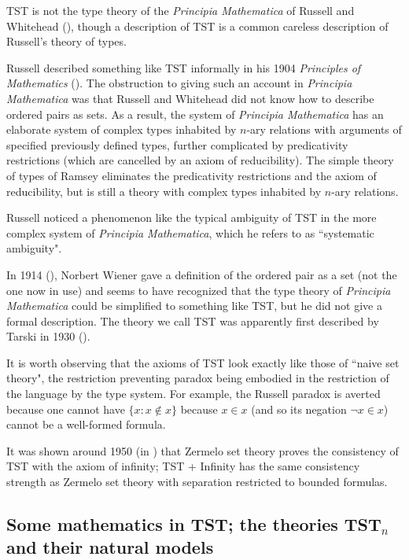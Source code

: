 \documentclass[112pt]{article}
\begin{document}
TST is not the type theory of the {\em Principia Mathematica\/} of Russell and Whitehead (\cite{pm}), though a description of TST is a common careless description of Russell's theory of types.

Russell described something like TST informally in his 1904 {\em Principles of Mathematics\/} (\cite{pm1}).  The obstruction to giving such an account in {\em Principia Mathematica\/} was that
Russell and Whitehead did not know how to describe ordered pairs as sets.  As a result, the system of {\em Principia Mathematica\/} has an elaborate system of  complex
types inhabited by $n$-ary relations with arguments of specified previously defined types, further complicated by predicativity restrictions (which are cancelled by an axiom of reducibility).
The simple theory of types of Ramsey eliminates the predicativity restrictions and the axiom of reducibility, but is still a theory with complex types inhabited by $n$-ary relations.

Russell noticed a phenomenon like the typical ambiguity of TST in the more complex system of {\em Principia Mathematica\/}, which he refers to as ``systematic ambiguity".

In 1914 (\cite{wiener}), Norbert Wiener gave a definition of the ordered pair as a set (not the one now in use) and seems to have recognized that the type theory of {\em Principia Mathematica\/} could be simplified to something like TST, but he did not give a formal description.  The theory we call TST was apparently first described by Tarski in 1930 (\cite{tarskiontst}).

It is worth observing that the axioms of TST look exactly like those of ``naive set theory", the restriction preventing paradox being embodied in the restriction of the language by the type system.
For example, the Russell paradox is averted because one cannot have $\{x:x \not\in x\}$ because $x \in x$ (and so its negation $\neg x \in x$) cannot be a well-formed formula.

It was shown around 1950 (in \cite{kemeny}) that Zermelo set theory proves the consistency of TST with the axiom of infinity;  TST + Infinity has the same consistency strength as
Zermelo set theory with separation restricted to bounded formulas.


\newpage

\subsection{Some mathematics in TST;  the theories TST$_n$ and their natural models}
\end{document}
